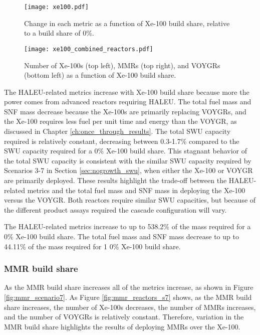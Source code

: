 \begin{figure}
    \centering
    \texttt{[image: xe100.pdf]}
    \caption{Change in each metric as a function of Xe-100 build share, 
    relative to a build share of 0\%.}
    \label{fig:xe100_scenario7}
\end{figure}

\begin{figure}
    \centering
    \texttt{[image: xe100\_combined\_reactors.pdf]}
    \caption{Number of Xe-100s (top left), MMRs (top right), and VOYGRs
    (bottom left) as a function of Xe-100 build share.}
    \label{fig:xe100_s7_combined_reactors}
\end{figure}

The \gls{HALEU}-related metrics increase with Xe-100 build share because more the 
power comes from advanced reactors requiring \gls{HALEU}. The total fuel mass and 
\gls{SNF} mass decrease because the Xe-100s are primarily replacing VOYGRs, and the 
Xe-100 requires less fuel per unit time and energy than the VOYGR, as discussed 
in Chapter \ref{ch:once_through_results}. The total \gls{SWU} capacity required 
is relatively constant, decreasing between 0.3-1.7\% compared to the \gls{SWU} capacity 
required for a 0\% Xe-100 build share. This stagnant behavior of the total 
\gls{SWU} capacity is consistent with the similar \gls{SWU} capacity required 
by Scenarios 3-7 in Section \ref{sec:nogrowth_swu}, when either the Xe-100 or 
VOYGR are primarily deployed. These results highlight the trade-off between the
\gls{HALEU}-related metrics and the total fuel mass and \gls{SNF} mass in deploying 
the Xe-100 versus the VOYGR. Both reactors require similar \gls{SWU} capacities, 
but because of the different product assays required the cascade configuration 
will vary. 

The \gls{HALEU}-related metrics increase to up to 538.2\% of the mass required 
for a 0\% Xe-100 build share. The total fuel mass and \gls{SNF} mass decrease 
to up to 44.11\% of the mass required for 1 0\% Xe-100 build share. 


\subsubsection{MMR build share}
As the \gls{MMR} build share increases all of the metrics increase, as shown 
in Figure \ref{fig:mmr_scenario7}. As Figure \ref{fig:mmr_reactors_s7} shows, 
as the \gls{MMR} build share increases, the number of Xe-100s decreases, the 
number of \glspl{MMR} increases, and the number of VOYGRs is relatively constant. 
Therefore, variation in the \gls{MMR} build share highlights the results of 
deploying \glspl{MMR} over the Xe-100. 


